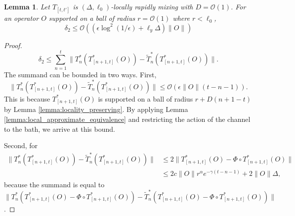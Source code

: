 \documentclass[prx,aps,amsmath,amssymb,floatfix,superscriptaddress,11pt,tightenlines,longbibliography,onecolumn,notitlepage]{revtex4-1}
\newtheorem{lem}{Lemma}
\begin{document}
\begin{lem}
  Let $T_{[t,t']}$ is $(\Delta, \ell_0)$-locally rapidly mixing with $D=\mathcal{O}(1)$. For an operator $O$ supported on a ball of radius $r=\mathcal{O}(1)$ where $r<\ell_0$,
  \begin{equation}
    \delta_2 \leq \mathcal{O}((\epsilon \log^2(1/\epsilon) + \ell_y \Delta)\|O\|)
  \end{equation}
\end{lem}
\begin{proof}
  \begin{equation}
    \delta_2 \leq \sum_{n=1}^t \|T_n^*(T_{[n+1,t]}^*(O)) - \tilde{T}_n^*(T_{[n+1,t]}^*(O)) \|.
  \end{equation}
  The summand can be bounded in two ways. First,
   \begin{equation}
    \|T_n^*(T_{[n+1,t]}^*(O)) - \tilde{T}_n^*(T_{[n+1,t]}^*(O)) \| \leq \mathcal{O}(\epsilon \|O \|(t-n-1)).
  \end{equation}
  This is because $T_{[n+1,t]}^*(O)$ is supported on a ball of radius $r+D(n+1-t)$ by Lemma \ref{lemma:locality_preserving}. By applying Lemma \ref{lemma:local_approximate_equivalence} and restricting the action of the channel to the bath, we arrive at this bound.

  Second, for 
  \begin{equation}
    \begin{aligned}
      \|T_n^*(T_{[n+1,t]}^*(O)) - \tilde{T}_n^*(T_{[n+1,t]}^*(O)) \| &\leq 2\|T_{[n+1,t]}^*(O) - \Phi \circ T_{[n+1,t]}^*(O) \|\\
      &\leq 2c\|O \|r^{\alpha} e^{-\gamma (t-n-1)} + 2\|O\|\Delta,
    \end{aligned}
  \end{equation}
  because the summand is equal to $ \|T_n^*(T_{[n+1,t]}^*(O) - \Phi\circ T_{[n+1,t]}^*(O)) - \tilde{T}^*_n(T_{[n+1,t]}^*(O) - \Phi \circ T_{[n+1,t]}^*(O)) \|$.


\end{proof}
\end{document}
